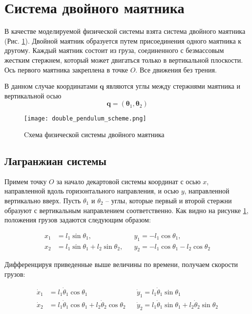 \documentclass[12pt]{article}
\begin{document}
\section{Система двойного маятника}

В качестве моделируемой физической системы взята система двойного маятника (Рис. \ref{fig:pendulum_system}). Двойной маятник образуется путем присоединения одного маятника к другому. Каждый маятник состоит из груза, соединенного с безмассовым жестким стержнем, который может двигаться только в вертикальной плоскости. Ось первого маятника закреплена в точке $O$. Все движения без трения.

В данном случае координатами $\textbf{q}$ являются углы между стержнями маятника и вертикальной осью $$\textbf{q} = (\mathbf{\theta}_1, \mathbf{\theta}_2)$$


\begin{figure}[H]
	\centering
	\texttt{[image: double\_pendulum\_scheme.png]}
	\caption{Cхема физической системы двойного маятника}
	\label{fig:pendulum_system}
\end{figure}

\subsection{Лагранжиан системы}

Примем точку $O$ за начало декартовой системы координат с осью $x$, направленной вдоль горизонтального направления, и осью $y$, направленной вертикально вверх. Пусть $\theta_1$ и $\theta_2$ -- углы, которые первый и второй стержни образуют с вертикальным направлением соответственно. Как видно на рисунке \ref{fig:pendulum_system}, положения грузов задаются следующим образом:

$$
\begin{aligned}
x_{1} & =l_{1} \sin \theta_{1}, && y_{1}=-l_{1} \cos \theta_{1}, \\
x_{2} & =l_{1} \sin \theta_{1}+l_{2} \sin \theta_{2}, &&  y_{2}=-l_{1} \cos \theta_{1}-l_{2} \cos \theta_{2}
\end{aligned}
$$

Дифференцируя приведенные выше величины по времени, получаем скорости грузов:

$$
\begin{aligned}
\dot{x}_{1} &=l_{1} \dot{\theta}_{1} \cos \theta_{1} & & \dot{y}_{1}=l_{1} \dot{\theta}_{1} \sin \theta_{1} \\
\dot{x}_{2} &=l_{1} \dot{\theta}_{1} \cos \theta_{1}+l_{2} \dot{\theta}_{2} \cos \theta_{2} & & \dot{y}_{2}=l_{1} \dot{\theta}_{1} \sin \theta_{1}+l_{2} \dot{\theta}_{2} \sin \theta_{2}
\end{aligned}
$$
\end{document}
